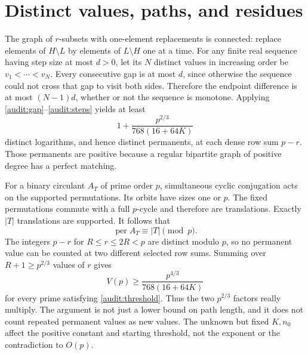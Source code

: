 \documentclass[11pt,a4paper]{article}
\newcommand{\per}{\operatorname{per}}
\begin{document}
\section{Distinct values, paths, and residues}
The graph of $r$-subsets with one-element replacements is connected: replace elements of $H\setminus L$ by elements of $L\setminus H$ one at a time. For any finite real sequence having step size at most $d>0$, let its $N$ distinct values in increasing order be $v_1<\cdots<v_N$. Every consecutive gap is at most $d$, since otherwise the sequence could not cross that gap to visit both sides. Therefore the endpoint difference is at most $(N-1)d$, whether or not the sequence is monotone. Applying \eqref{audit:gap}--\eqref{audit:steps} yields at least
\[
 1+\frac{p^{2/3}}{768(16+64K)}
\]
distinct logarithms, and hence distinct permanents, at each dense row sum $p-r$. Those permanents are positive because a regular bipartite graph of positive degree has a perfect matching.

For a binary circulant $A_T$ of prime order $p$, simultaneous cyclic conjugation acts on the supported permutations. Its orbits have sizes one or $p$. The fixed permutations commute with a full $p$-cycle and therefore are translations. Exactly $|T|$ translations are supported. It follows that
\[
 \per A_T\equiv |T|\pmod p.
\]
The integers $p-r$ for $R\le r\le2R<p$ are distinct modulo $p$, so no permanent value can be counted at two different selected row sums. Summing over $R+1\ge p^{2/3}$ values of $r$ gives
\begin{equation}\label{audit:bound}
 \boxed{V(p)\ge\frac{p^{4/3}}{768(16+64K)}}
\end{equation}
for every prime satisfying \eqref{audit:threshold}. Thus the two $p^{2/3}$ factors really multiply. The argument is not just a lower bound on path length, and it does not count repeated permanent values as new values. The unknown but fixed $K,n_0$ affect the positive constant and starting threshold, not the exponent or the contradiction to $O(p)$.
\end{document}
